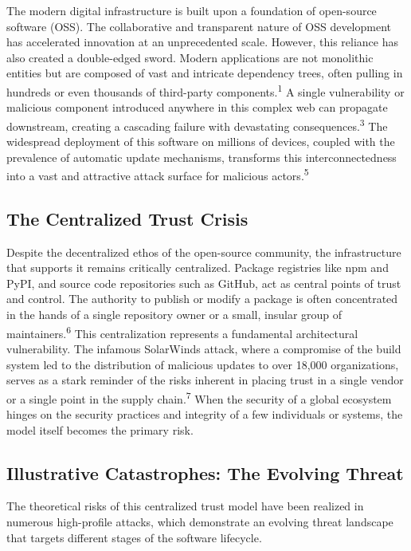 \documentclass{article}
\begin{document}
The modern digital infrastructure is built upon a foundation of open-source software (OSS). The collaborative and transparent nature of OSS development has accelerated innovation at an unprecedented scale. However, this reliance has also created a double-edged sword. Modern applications are not monolithic entities but are composed of vast and intricate dependency trees, often pulling in hundreds or even thousands of third-party components.\textsuperscript{1} A single vulnerability or malicious component introduced anywhere in this complex web can propagate downstream, creating a cascading failure with devastating consequences.\textsuperscript{3} The widespread deployment of this software on millions of devices, coupled with the prevalence of automatic update mechanisms, transforms this interconnectedness into a vast and attractive attack surface for malicious actors.\textsuperscript{5}

\subsection{The Centralized Trust Crisis}

Despite the decentralized ethos of the open-source community, the infrastructure that supports it remains critically centralized. Package registries like npm and PyPI, and source code repositories such as GitHub, act as central points of trust and control. The authority to publish or modify a package is often concentrated in the hands of a single repository owner or a small, insular group of maintainers.\textsuperscript{6} This centralization represents a fundamental architectural vulnerability. The infamous SolarWinds attack, where a compromise of the build system led to the distribution of malicious updates to over 18,000 organizations, serves as a stark reminder of the risks inherent in placing trust in a single vendor or a single point in the supply chain.\textsuperscript{7} When the security of a global ecosystem hinges on the security practices and integrity of a few individuals or systems, the model itself becomes the primary risk.

\subsection{Illustrative Catastrophes: The Evolving Threat}

The theoretical risks of this centralized trust model have been realized in numerous high-profile attacks, which demonstrate an evolving threat landscape that targets different stages of the software lifecycle.
\end{document}
